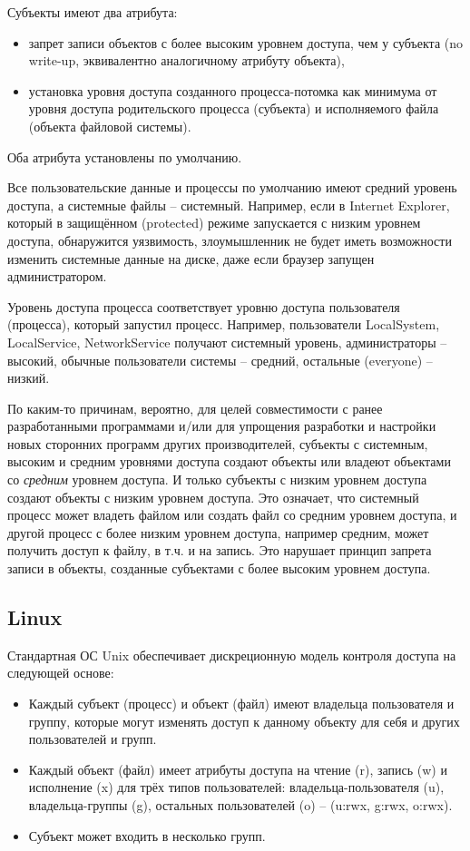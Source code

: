 Субъекты имеют два атрибута:
\begin{itemize}
    \item запрет записи объектов с более высоким уровнем доступа, чем у субъекта (no write-up, эквивалентно аналогичному атрибуту объекта),
    \item установка уровня доступа созданного процесса-потомка как минимума от уровня доступа родительского процесса (субъекта) и исполняемого файла (объекта файловой системы).
\end{itemize}
Оба атрибута установлены по умолчанию.

Все пользовательские данные и процессы по умолчанию имеют средний уровень доступа, а системные файлы -- системный. Например, если в Internet Explorer, который в защищённом (protected) режиме запускается с низким уровнем доступа, обнаружится уязвимость, злоумышленник не будет иметь возможности изменить системные данные на диске, даже если браузер запущен администратором.

Уровень доступа процесса соответствует уровню доступа пользователя (процесса), который запустил процесс. Например, пользователи LocalSystem, LocalService, NetworkService получают системный уровень, администраторы -- высокий, обычные пользователи системы -- средний, остальные (everyone) -- низкий.

По каким-то причинам, вероятно, для целей совместимости с ранее разработанными программами и/или для упрощения разработки и настройки новых сторонних программ других производителей, субъекты с системным, высоким и средним уровнями доступа создают объекты или владеют объектами со \emph{средним} уровнем доступа. И только субъекты с низким уровнем доступа создают объекты с низким уровнем доступа. Это означает, что системный процесс может владеть файлом или создать файл со средним уровнем доступа, и другой процесс с более низким уровнем доступа, например средним, может получить доступ к файлу, в т.ч. и на запись. Это нарушает принцип запрета записи в объекты, созданные субъектами с более высоким уровнем доступа.


\subsection{Linux}

Стандартная ОС Unix обеспечивает дискреционную модель контроля доступа на следующей основе:
\begin{itemize}
    \item Каждый субъект (процесс) и объект (файл) имеют владельца пользователя и группу, которые могут изменять доступ к данному объекту для себя и других пользователей и групп.
    \item Каждый объект (файл) имеет атрибуты доступа на чтение (r), запись (w) и исполнение (x) для трёх типов пользователей: владельца-пользователя (u), владельца-группы (g), остальных пользователей (o) -- (u:rwx, g:rwx, o:rwx).
    \item Субъект может входить в несколько групп.
\end{itemize}

